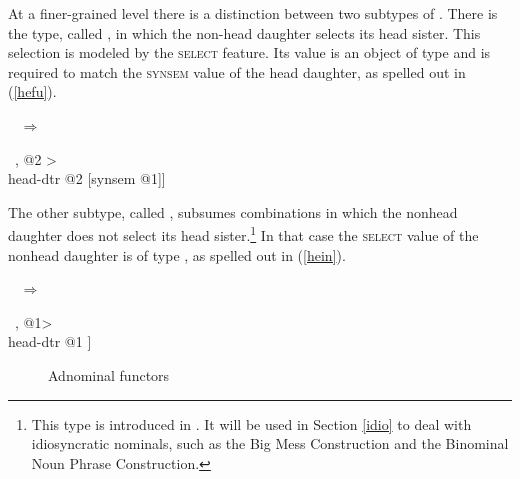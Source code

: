 \documentclass[output=paper
                ,modfonts
                ,nonflat
	        ,collection
	        ,collectionchapter
	        ,collectiontoclongg
 	        ,biblatex
                ,babelshorthands
                ,newtxmath
                ,draftmode
                ,colorlinks, citecolor=brown
]{./langsci/langscibook}
\begin{document}
\noindent
At a finer-grained level there is a distinction between two subtypes of 
. There is the type, called ,  
in which the non-head daughter selects its head sister. This selection is modeled 
by the \textsc{select} feature. Its value is an object of type  and is 
required to match the \textsc{synsem} value of the head daughter, as spelled out 
in (\ref{hefu}).  

\begin{exe}
\ex\label{hefu} 
 ~ $\Rightarrow$ ~ 
\begin{avm}
[dtrs <[synsem|loc|category|head|select @1]~, @2 > \\
 head-dtr @2 [synsem @1]]
\end{avm}
\end{exe} 

\noindent
The other subtype, called , subsumes combinations in 
which the nonhead daughter does not select its head sister.\footnote{This type is 
introduced in \citet[130]{VanEynde98a}. It will be used in Section \ref{idio} to deal with 
idiosyncratic nominals, such as the Big Mess Construction and the Binominal Noun Phrase 
Construction.} In that case the \textsc{select} value of the nonhead daughter is of type 
, as spelled out in (\ref{hein}). 

\begin{exe}
\ex\label{hein} 
 ~ $\Rightarrow$ ~ 
\begin{avm}
[dtrs <[synsem|loc|category|head|select \type{none}]~, @1> \\
 head-dtr @1 ]
\end{avm}
\end{exe}    

\begin{figure}
\centering
{}
\caption{\label{markyy} Adnominal functors}
\end{figure}
\end{document}
